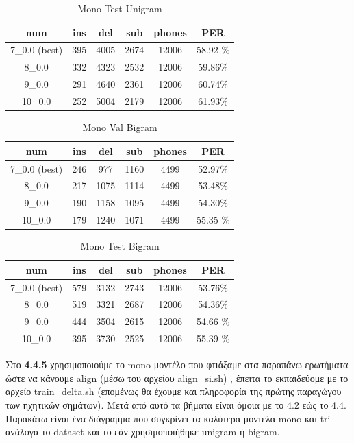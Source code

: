 \documentclass{article}
\begin{document}
%
%
%
\begin{table}[h!]
\caption{Mono Test Unigram}
\centering
\begin{tabular}{|c | c | c | c | c| c |}
\hline
num &  ins & del & sub & phones & PER\\
\hline
\rowcolor{green!20} 7\_0.0 (best) & 395 & 4005 & 2674 & 12006 & 58.92 \% \\
8\_0.0 & 332 & 4323 & 2532 & 12006 & 59.86\% \\ %
9\_0.0 & 291 & 4640 & 2361  & 12006 & 60.74\% \\ %
 10\_0.0& 252 & 5004 & 2179 & 12006 &61.93\% \\ %
\hline
\end{tabular}
\end{table}
%
%
%
\begin{table}[h!]
\caption{Mono Val Bigram}
\centering
\begin{tabular}{|c | c | c | c | c| c |}
\hline
num &  ins & del & sub & phones & PER\\
\hline
\rowcolor{green!20} 7\_0.0 (best) & 246 & 977 & 1160 & 4499  &  52.97\% \\
8\_0.0 & 217 & 1075 & 1114 & 4499 & 53.48\% \\ %
9\_0.0 & 190 & 1158 & 1095 & 4499 & 54.30\% \\ %
10\_0.0 & 179 & 1240 & 1071 & 4499 & 55.35 \% \\ %
\hline
\end{tabular}
\end{table}
%
%
%
\begin{table}[h!]
\caption{Mono Test Bigram}
\centering
\begin{tabular}{|c | c | c | c | c| c |}
\hline
num &  ins & del & sub & phones & PER\\
\hline
\rowcolor{green!20}7\_0.0  (best)& 579 & 3132 & 2743 & 12006 & 53.76\% \\
8\_0.0 & 519 & 3321 & 2687 & 12006 & 54.36\% \\ %
9\_0.0 & 444 & 3504 & 2615 & 12006 & 54.66 \% \\ %
10\_0.0 & 395 & 3730 & 2525 & 12006 & 55.39 \% \\ %
\hline
\end{tabular}
\end{table}
%
\newpage
Στο \textbf{4.4.5} χρησιμοποιούμε το mono μοντέλο που φτιάξαμε στα παραπάνω ερωτήματα ώστε να κάνουμε align (μέσω του αρχείου align\_si.sh) , έπειτα  το εκπαιδεύομε με το αρχείο train\_delta.sh (επομένως θα έχουμε και πληροφορία της πρώτης παραγώγου των ηχητικών σημάτων). Μετά από αυτό τα βήματα είναι όμοια με το 4.2 εώς το 4.4. Παρακάτω είναι ένα διάγραμμα που συγκρίνει τα καλύτερα μοντέλα mono και tri ανάλογα το dataset και το εάν χρησιμοποιήθηκε unigram ή bigram.
\end{document}
